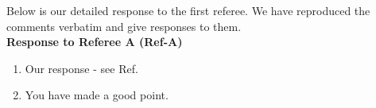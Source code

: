 
Below is our detailed response to the first referee. We have reproduced the comments verbatim and give responses to them.\\

\bigskip
\noindent\textbf{Response to Referee A (Ref-A)}
%

\begin{enumerate}[start=1,label={\color{black}(\bfseries Ref-A \arabic*):}]
	\item {}
	
Our response - see Ref.\cite{Nicholson2020}
	
	\item {}
	
	You have made a good point. 
\end{enumerate}


